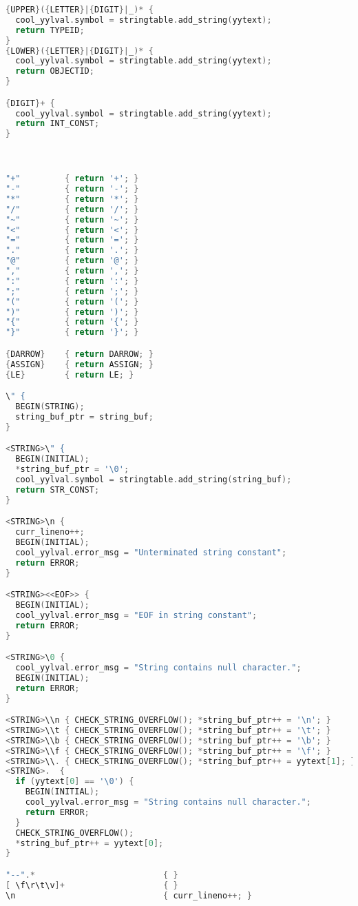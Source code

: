 \documentclass[a4paper,12pt]{article}
\begin{document}
\begin{lstlisting}[language=C]
{UPPER}({LETTER}|{DIGIT}|_)* {
  cool_yylval.symbol = stringtable.add_string(yytext);
  return TYPEID;
}
{LOWER}({LETTER}|{DIGIT}|_)* {
  cool_yylval.symbol = stringtable.add_string(yytext);
  return OBJECTID;
}

{DIGIT}+ {
  cool_yylval.symbol = stringtable.add_string(yytext);
  return INT_CONST;
}



"+"         { return '+'; }
"-"         { return '-'; }
"*"         { return '*'; }
"/"         { return '/'; }
"~"         { return '~'; }
"<"         { return '<'; }
"="         { return '='; }
"."         { return '.'; }
"@"         { return '@'; }
","         { return ','; }
":"         { return ':'; }
";"         { return ';'; }
"("         { return '('; }
")"         { return ')'; }
"{"         { return '{'; }
"}"         { return '}'; }

{DARROW}    { return DARROW; }
{ASSIGN}    { return ASSIGN; }
{LE}        { return LE; }

\" {
  BEGIN(STRING);
  string_buf_ptr = string_buf;
}

<STRING>\" {
  BEGIN(INITIAL);
  *string_buf_ptr = '\0';
  cool_yylval.symbol = stringtable.add_string(string_buf);
  return STR_CONST;
}

<STRING>\n {
  curr_lineno++;
  BEGIN(INITIAL);
  cool_yylval.error_msg = "Unterminated string constant";
  return ERROR;
}

<STRING><<EOF>> {
  BEGIN(INITIAL);
  cool_yylval.error_msg = "EOF in string constant";
  return ERROR;
}

<STRING>\0 {
  cool_yylval.error_msg = "String contains null character.";
  BEGIN(INITIAL);
  return ERROR;
}

<STRING>\\n { CHECK_STRING_OVERFLOW(); *string_buf_ptr++ = '\n'; }
<STRING>\\t { CHECK_STRING_OVERFLOW(); *string_buf_ptr++ = '\t'; }
<STRING>\\b { CHECK_STRING_OVERFLOW(); *string_buf_ptr++ = '\b'; }
<STRING>\\f { CHECK_STRING_OVERFLOW(); *string_buf_ptr++ = '\f'; }
<STRING>\\. { CHECK_STRING_OVERFLOW(); *string_buf_ptr++ = yytext[1]; }
<STRING>.  {
  if (yytext[0] == '\0') {
    BEGIN(INITIAL);
    cool_yylval.error_msg = "String contains null character.";
    return ERROR;
  }
  CHECK_STRING_OVERFLOW();
  *string_buf_ptr++ = yytext[0];
}

"--".*                          { }
[ \f\r\t\v]+                    { }
\n                              { curr_lineno++; }


\end{lstlisting}
\end{document}
